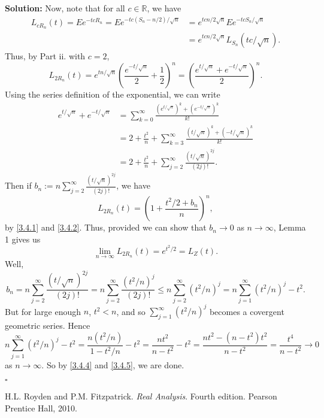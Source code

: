 \documentclass[12pt]{article}
\newcounter{ProofCounter}
\newenvironment{Solution}{\stepcounter{ProofCounter}\textbf{Solution:}}{\hfill$\square$}
\begin{document}
\begin{Solution}
  Now, note that for all $c \in \mathbb{R}$, we have
  \begin{align*}
    L_{cR_n}(t) = Ee^{-tcR_n} = Ee^{-tc(S_n - n/2) / \sqrt{n}} & = e^{tcn / 2\sqrt{n}} Ee^{-tcS_n / \sqrt{n}} \\
    & = e^{tcn / 2\sqrt{n}} L_{S_n}(tc / \sqrt{n}).
  \end{align*}
  Thus, by Part ii. with $c = 2$,
  \begin{equation}
    L_{2R_n}(t) = e^{tn/\sqrt{n}} \left( \frac{e^{-t/\sqrt{n}}}{2} + \frac{1}{2} \right)^{n} = \left( \frac{e^{t/\sqrt{n}} + e^{-t/\sqrt{n}}}{2} \right)^{n}.
    \label{3.4.1}
  \end{equation}
  Using the series definition of the exponential, we can write
  \begin{align}
    e^{t/\sqrt{n}} + e^{-t/\sqrt{n}} & = \sum_{k=0}^{\infty} \frac{(e^{t/\sqrt{n}})^k + (e^{-t/\sqrt{n}})^k}{k!} \nonumber \\
    & = 2 + \frac{t^2}{n} + \sum_{k=3}^{\infty} \frac{(t/\sqrt{n})^k + (-t/\sqrt{n})^k}{k!} \nonumber \\
    & = 2 + \frac{t^2}{n} + \sum_{j=2}^{\infty} \frac{(t/\sqrt{n})^{2j}}{(2j)!}.
    \label{3.4.2}
  \end{align}
  Then if $b_n := n\sum_{j=2}^{\infty} \frac{(t/\sqrt{n})^{2j}}{(2j)!}$, we have
  \begin{equation}
    L_{2R_n}(t) = \left( 1 + \frac{t^2 / 2 + b_n}{n} \right)^{n},
    \label{3.4.3}
  \end{equation}
  by \eqref{3.4.1} and \eqref{3.4.2}. Thus, provided we can show that $b_n \rightarrow 0$ as $n \rightarrow \infty$, Lemma 1 gives us
  \[
    \lim_{n\rightarrow\infty} L_{2R_n}(t) = e^{t^2/2} = L_{Z}(t).
  \]
  Well,
  \begin{equation}
    b_n = n\sum_{j=2}^{\infty} \frac{(t/\sqrt{n})^{2j}}{(2j)!} = n\sum_{j=2}^{\infty} \frac{(t^2 / n)^j}{(2j)!} \leq n\sum_{j=2}^{\infty} (t^2 / n)^j = n\sum_{j=1}^{\infty}(t^2 / n)^j - t^2.
    \label{3.4.4}
  \end{equation}
  But for large enough $n$, $t^2 < n$, and so $\sum_{j=1}^{\infty}(t^2 / n)^j$ becomes a covergent geometric series. Hence
  \begin{equation}
    n\sum_{j=1}^{\infty}(t^2 / n)^j - t^2 = \frac{n(t^2/n)}{1 - t^2/n} - t^2 = \frac{nt^2}{n - t^2} - t^2 = \frac{nt^2 - (n-t^2)t^2}{n-t^2} = \frac{t^4}{n-t^2} \rightarrow 0
    \label{3.4.5}
  \end{equation}
  as $n \rightarrow \infty$. So by \eqref{3.4.4} and \eqref{3.4.5}, we are done.

\end{Solution}


\begin{thebibliography}{9}
    H.L. Royden and P.M. Fitzpatrick.
    \textit{Real Analysis}. Fourth edition.
    Pearson Prentice Hall, 2010.
\end{thebibliography}
\end{document}
